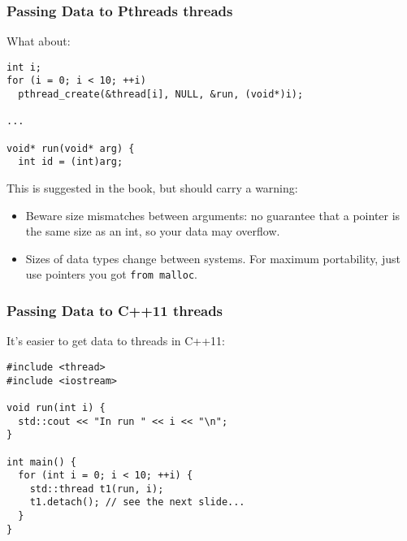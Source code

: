 \documentclass[aspectratio=43]{beamer}
\newenvironment{changemargin}[1]{%
  \begin{list}{}{%
    \setlength{\topsep}{0pt}%
    \setlength{\leftmargin}{#1}%
    \setlength{\rightmargin}{1em}
    \setlength{\listparindent}{\parindent}%
    \setlength{\itemindent}{\parindent}%
    \setlength{\parsep}{\parskip}%
  }%
  \item[]}{\end{list}}
\begin{document}
\begin{frame}[fragile]
  \frametitle{Passing Data to Pthreads threads}

\begin{changemargin}{1.5cm}
What about:
\begin{lstlisting}
int i;
for (i = 0; i < 10; ++i)
  pthread_create(&thread[i], NULL, &run, (void*)i);

...

void* run(void* arg) {
  int id = (int)arg;
\end{lstlisting}
  \vfill
  This is suggested in the book, but should carry a warning:

  \vfill
  \begin{itemize}
    \item<2-> Beware size mismatches between arguments: 
      no guarantee that a pointer is the same size as an int, so your data
      may overflow.
    \item<2-> Sizes of data types change between systems. For maximum
      portability, just use pointers you got {\tt from malloc}.
  \end{itemize}
\end{changemargin}

\end{frame}

\begin{frame}[fragile]
  \frametitle{Passing Data to C++11 threads}
\begin{changemargin}{1.5cm}
It's easier to get data to threads in C++11:
\begin{lstlisting}
#include <thread>
#include <iostream>

void run(int i) {
  std::cout << "In run " << i << "\n";
}

int main() {
  for (int i = 0; i < 10; ++i) {
    std::thread t1(run, i);
    t1.detach(); // see the next slide...
  }
}
\end{lstlisting}
\end{changemargin}
  
\end{frame}
\end{document}
